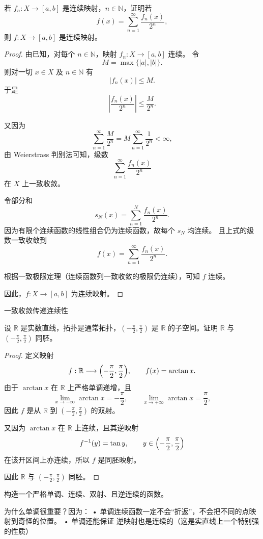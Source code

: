 \begin{homework}[3.3]
若 $f_n : X \to [a,b]$ 是连续映射，$n \in \mathbb{N}$，证明若
\[
f(x) = \sum_{n=1}^{\infty} \frac{f_n(x)}{2^n},
\]
则 $f : X \to [a,b]$ 是连续映射。
\end{homework}
\begin{proof}
由已知，对每个 $n\in\mathbb{N}$，映射 $f_n:X\to[a,b]$ 连续。
令 
\[
M=\max\{|a|,|b|\}.
\]
则对一切 $x\in X$ 及 $n\in\mathbb{N}$ 有
\[
|f_n(x)|\le M.
\]
于是
\[
\left|\frac{f_n(x)}{2^n}\right|\le \frac{M}{2^n}.
\]

又因为
\[
\sum_{n=1}^{\infty}\frac{M}{2^n}=M\sum_{n=1}^\infty\frac1{2^n}<\infty,
\]
由 Weierstrass 判别法可知，级数
\[
\sum_{n=1}^{\infty}\frac{f_n(x)}{2^n}
\]
在 $X$ 上一致收敛。

令部分和
\[
s_N(x)=\sum_{n=1}^N \frac{f_n(x)}{2^n}.
\]
因为有限个连续函数的线性组合仍为连续函数，故每个 $s_N$ 均连续。
且上式的级数一致收敛到
\[
f(x)=\sum_{n=1}^{\infty}\frac{f_n(x)}{2^n}.
\]

根据一致极限定理（连续函数列一致收敛的极限仍连续），可知 $f$ 连续。

因此，$f:X\to[a,b]$ 为连续映射。
\end{proof}
\begin{dxtips}
    一致收敛传递连续性
\end{dxtips}
\begin{homework}[10] 
设 $\mathbb{R}$ 是实数直线，拓扑是通常拓扑，$( -\frac{\pi}{2}, \frac{\pi}{2} )$ 是 $\mathbb{R}$ 的子空间。证明 $\mathbb{R}$ 与 $ \left( -\frac{\pi}{2}, \frac{\pi}{2} \right)$ 同胚。
\end{homework}
\begin{proof}
定义映射
\[
f:\mathbb R\longrightarrow\Bigl(-\frac{\pi}{2},\frac{\pi}{2}\Bigr),\qquad 
f(x)=\arctan x.
\]
由于 $\arctan x$ 在 $\mathbb R$ 上严格单调递增，且
\[
\lim_{x\to -\infty}\arctan x=-\frac{\pi}{2},\qquad 
\lim_{x\to +\infty}\arctan x=\frac{\pi}{2},
\]
因此 $f$ 是从 $\mathbb R$ 到 $(-\frac{\pi}{2},\frac{\pi}{2})$ 的双射。

又因为 $\arctan x$ 在 $\mathbb R$ 上连续，且其逆映射
\[
f^{-1}(y)=\tan y,\qquad y\in\Bigl(-\frac{\pi}{2},\frac{\pi}{2}\Bigr)
\]
在该开区间上亦连续，所以 $f$ 是同胚映射。

因此 $\mathbb R$ 与 $(-\frac{\pi}{2},\frac{\pi}{2})$ 同胚。
\end{proof}
\begin{dxtips}
    构造一个严格单调、连续、双射、且逆连续的函数。

为什么单调很重要？因为：
	•	单调连续函数一定不会“折返”，不会把不同的点映射到奇怪的位置。
	•	单调还能保证 逆映射也是连续的（这是实直线上一个特别强的性质）
\end{dxtips}
